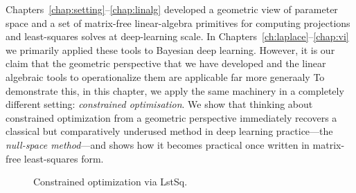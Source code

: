\noindent
Chapters~\ref{chap:setting}--\ref{chap:linalg} developed a geometric view of parameter space and a set of matrix-free linear-algebra primitives
for computing projections and least-squares solves at deep-learning scale.
In Chapters~\ref{ch:laplace}--\ref{chap:vi} we primarily applied these tools to Bayesian deep learning. However, it is our claim that the geometric perspective that we have developed and the linear algebraic tools to operationalize them are applicable far more generaaly
To demonstrate this, in this chapter, we apply the same machinery in a completely different setting: \emph{constrained optimisation}.
We show that thinking about constrained optimization from a geometric perspective immediately recovers a classical but comparatively underused method in deep learning practice---the \emph{null-space method}---and shows how it becomes practical once written in matrix-free least-squares form.

\begin{figure}
    \footnotesize
    

\caption{Constrained optimization via \textsf{LstSq}.}
\label{figure-one}
\end{figure}


